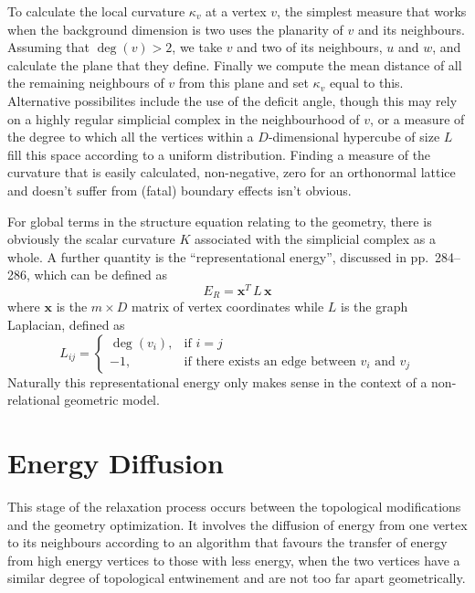 \documentclass[12pt,letterpaper]{report}
\begin{document}
To calculate the local curvature $\kappa_v$ at a vertex $v$, the simplest measure that works when the background 
dimension is two uses the planarity of $v$ and its neighbours. Assuming that $\deg(v) > 2$, we take $v$ and two 
of its neighbours, $u$ and $w$, and calculate the plane that they define. Finally we compute the mean distance of 
all the remaining neighbours of $v$ from this plane and set $\kappa_v$ equal to this. Alternative possibilites 
include the use of the deficit angle, though this may rely on a highly regular simplicial complex in the 
neighbourhood of $v$, or a measure of the degree to which all the vertices within a $D$-dimensional hypercube of 
size $L$ fill this space according to a uniform distribution. Finding a measure of the curvature that is easily 
calculated, non-negative, zero for an orthonormal lattice and doesn't suffer from (fatal) boundary effects isn't 
obvious.   
 
For global terms in the structure equation relating to the geometry, there is obviously the scalar curvature
$K$ associated with the simplicial complex as a whole. A further quantity is the ``representational 
energy'', discussed in \cite{Godsil} pp.\ 284--286, which can be defined as 
\begin{equation*}
E_R = \mathbf{x}^T \, L \, \mathbf{x}
\end{equation*}
where $\mathbf{x}$ is the $m\times D$ matrix of vertex coordinates while $L$ is the graph Laplacian, defined 
as 
\begin{equation*}
L_{ij} = \begin{cases}
           \deg(v_i),& \text{if } i=j\\
           -1,& \text{if there exists an edge between $v_i$ and $v_j$}
         \end{cases}
\end{equation*}
Naturally this representational energy only makes sense in the context of a non-relational geometric model. 

\section{Energy Diffusion}

This stage of the relaxation process occurs between the topological modifications and the geometry 
optimization. It involves the diffusion of energy from one vertex to its neighbours according to an 
algorithm that favours the transfer of energy from high energy vertices to those with less energy, when 
the two vertices have a similar degree of topological entwinement and are not too far apart geometrically.
\end{document}
